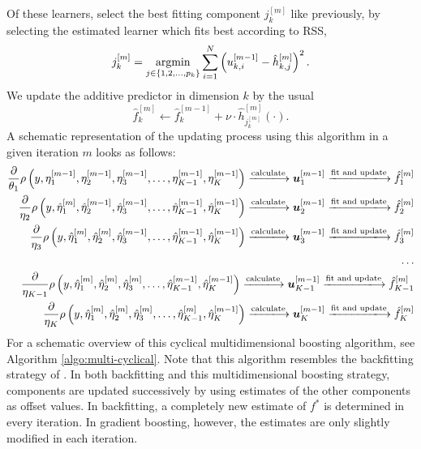 Of these learners, select the best fitting component $j_k^{[m]}$ like previously, by selecting the estimated learner which fits best according to RSS,
\begin{equation*}
    j_k^{[m]}=\operatorname*{argmin}_{j\in\{1,2,\ldots,p_k\}}\sum_{i=1}^N \left(u_{k,i}^{[m-1]}-\hat{h}_{k,j}^{[m]}\right)^2.
\end{equation*}
We update the additive predictor in dimension $k$ by the usual
\begin{equation*}
    \hat{f}_k^{[m]}\gets\hat{f}_k^{[m-1]}+\nu\cdot \hat{h}^{[m]}_{j_k^{[m]}}(\cdot).
\end{equation*}
A schematic representation of the updating process using this algorithm in a given iteration $m$ looks as follows:
\begin{align*}
    \frac{\partial}{\theta_1}\rho\left(y,\eta_1^{[m-1]},\eta_2^{[m-1]},\eta_3^{[m-1]},\ldots,\eta_{K-1}^{[m-1]},\eta_K^{[m-1]}\right)
    \xlongrightarrow{\text{calculate}}\u_{1}^{[m-1]}
    \xlongrightarrow{\text{fit and update}}\hat{f}_{1}^{[m]} \\
    \frac{\partial}{\eta_2}\rho\left(y,\hat{\eta}_1^{[m]},\hat{\eta}_2^{[m-1]},\hat{\eta}_3^{[m-1]},\ldots,\hat{\eta}_{K-1}^{[m-1]},\hat{\eta}_K^{[m-1]}\right)
    \xlongrightarrow{\text{calculate}} \u_{2}^{[m-1]}
    \xlongrightarrow{\text{fit and update}}\hat{f}_{2}^{[m]} \\
    \frac{\partial}{\eta_3}\rho\left(y,\hat{\eta}_1^{[m]},\hat{\eta}_2^{[m]},\hat{\eta}_3^{[m-1]},\ldots,\hat{\eta}_{K-1}^{[m-1]},\hat{\eta}_K^{[m-1]}\right)
    \xlongrightarrow{\text{calculate}}\u_{3}^{[m-1]}
    \xlongrightarrow{\text{fit and update}}\hat{f}_{3}^{[m]} \\
    \ldots\\
    \frac{\partial}{\eta_{K-1}}\rho\left(y,\hat{\eta}_1^{[m]},\hat{\eta}_2^{[m]},\hat{\eta}_3^{[m]},\ldots,\hat{\eta}_{K-1}^{[m-1]},\hat{\eta}_K^{[m-1]}\right)
    \xlongrightarrow{\text{calculate}}\u_{K-1}^{[m-1]}
    \xlongrightarrow{\text{fit and update}}\hat{f}_{K-1}^{[m]} \\
    \frac{\partial}{\eta_K}\rho\left(y,\hat{\eta}_1^{[m]},\hat{\eta}_2^{[m]},\hat{\eta}_3^{[m]},\ldots,\hat{\eta}_{K-1}^{[m]},\hat{\eta}_K^{[m-1]}\right)
    \xlongrightarrow{\text{calculate}}\u_{K}^{[m-1]}
    \xlongrightarrow{\text{fit and update}}\hat{f}_{K}^{[m]}
\end{align*}
For a schematic overview of this cyclical multidimensional boosting algorithm, see Algorithm \ref{algo:multi-cyclical}.
Note that this algorithm resembles the backfitting strategy of \citet{hastie1986}.
In both backfitting and this multidimensional boosting strategy, components are updated successively by using estimates of the other components as offset values.
In backfitting, a completely new estimate of $f^*$ is determined in every iteration.
In gradient boosting, however, the estimates are only slightly modified in each iteration.

